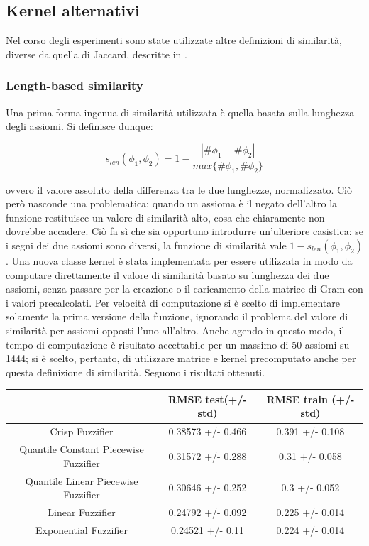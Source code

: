\documentclass[12pt,a4paper]{report}
\begin{document}
\subsection{Kernel alternativi}
Nel corso degli esperimenti sono state utilizzate altre definizioni di similarità, diverse da quella di Jaccard, descritte in \cite{drtpaper}.
\subsubsection{Length-based similarity}
Una prima forma ingenua di similarità utilizzata è quella basata sulla lunghezza degli assiomi.
Si definisce dunque:

\[ s_{len}(\phi_1, \phi_2) = 1 - \frac{|\# \phi_1 - \# \phi_2|}{max\{\#\phi_1, \#\phi_2\}}\]

ovvero il valore assoluto della differenza tra le due lunghezze, normalizzato.
Ciò però nasconde una problematica: quando un assioma è il negato dell'altro la funzione restituisce un valore di similarità alto, cosa che chiaramente non dovrebbe accadere. Ciò fa sì che sia opportuno introdurre un'ulteriore casistica: se i segni dei due assiomi sono diversi, la funzione di similarità vale $1 - s_{len}(\phi_1,\phi_2)$.
Una nuova classe kernel è stata implementata per essere utilizzata in modo da computare direttamente il valore di similarità basato su lunghezza dei due assiomi, senza passare per la creazione o il caricamento della matrice di Gram con i valori precalcolati.
Per velocità di computazione si è scelto di implementare solamente la prima versione della funzione, ignorando il problema del valore di similarità per assiomi opposti l'uno all'altro.
Anche agendo in questo modo, il tempo di computazione è risultato accettabile per un massimo di 50 assiomi su 1444; si è scelto, pertanto, di utilizzare matrice e kernel precomputato anche per questa definizione di similarità. Seguono i risultati ottenuti.

\begin{table}[h!]
\centering 	
	\begin{tabular}{|c|c|c|} 
	 \hline
	  & RMSE test(+/- std) & RMSE train (+/- std)\\ [0.5ex] 
	 \hline
	 Crisp Fuzzifier & 0.38573 +/- 0.466 & 0.391 +/- 0.108 \\ 
	 \hline
	 Quantile Constant Piecewise Fuzzifier & 0.31572 +/- 0.288 & 0.31 +/- 0.058\\
	 \hline
	 Quantile Linear Piecewise Fuzzifier & 0.30646 +/- 0.252 & 0.3 +/- 0.052\\
	 \hline
	 Linear Fuzzifier & 0.24792 +/- 0.092 & 0.225 +/- 0.014\\
	 \hline
	 Exponential Fuzzifier & 0.24521 +/- 0.11 & 0.224 +/- 0.014\\ [1ex] 
	 \hline
	\end{tabular}
\end{table}
\end{document}
